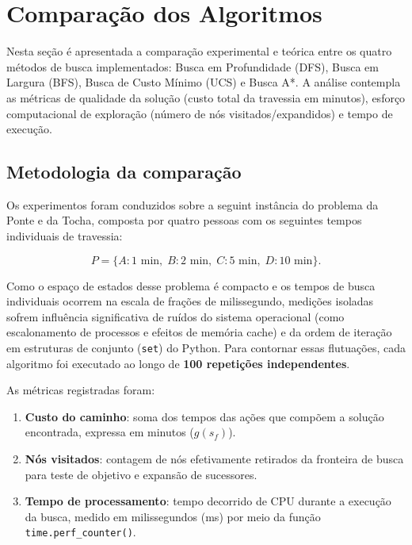 \section{Comparação dos Algoritmos}
\label{sec:comparacao-algoritmos}

Nesta seção é apresentada a comparação experimental e teórica entre os quatro métodos
de busca implementados: Busca em Profundidade (DFS), Busca em Largura (BFS),
Busca de Custo Mínimo (UCS) e Busca A*. A análise contempla as métricas de qualidade da
solução (custo total da travessia em minutos), esforço computacional de exploração
(número de nós visitados/expandidos) e tempo de execução.

\subsection{Metodologia da comparação}
\label{subsec:metodologia}

Os experimentos foram conduzidos sobre a seguint instância  do problema da Ponte e da
Tocha, composta por quatro pessoas com os seguintes tempos individuais de travessia:

\begin{equation}
	P = \{A: 1\text{ min},\; B: 2\text{ min},\; C: 5\text{ min},\; D: 10\text{ min}\}.
\end{equation}

Como o espaço de estados desse problema é compacto e os tempos de busca individuais
ocorrem na escala de frações de milissegundo, medições isoladas sofrem influência
significativa de ruídos do sistema operacional (como escalonamento de processos e
efeitos de memória cache) e da ordem de iteração em estruturas de conjunto
(\texttt{set}) do Python. Para contornar essas flutuações, cada algoritmo foi executado
ao longo de \textbf{100 repetições independentes}.

As métricas registradas foram:
\begin{enumerate}
	\item \textbf{Custo do caminho}: soma dos tempos das ações que compõem a solução encontrada, expressa em minutos ($g(s_f)$).
	\item \textbf{Nós visitados}: contagem de nós efetivamente retirados da fronteira de busca para teste de objetivo e expansão de sucessores.
	\item \textbf{Tempo de processamento}: tempo decorrido de CPU durante a execução da busca, medido em milissegundos (ms) por meio da função \texttt{time.perf\_counter()}.
\end{enumerate}

